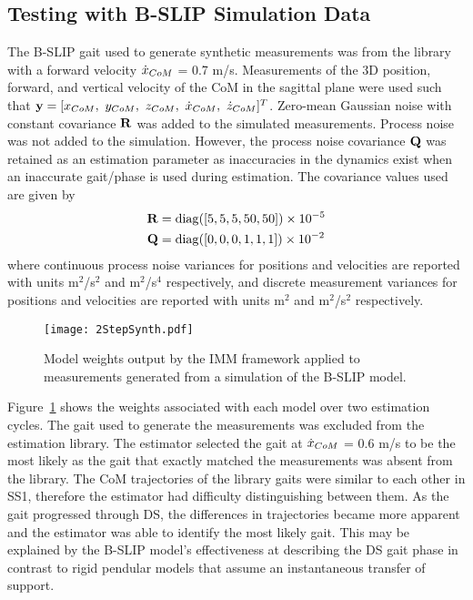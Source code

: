 \subsection{Testing with B-SLIP Simulation Data}

The B-SLIP gait used to generate synthetic measurements was from the library with a forward velocity $ \dot{x}_{CoM} $ = 0.7 m/s. Measurements of the 3D position, forward, and vertical velocity of the CoM in the sagittal plane were used such that $ \y = [x_{\com},\ y_{\com},\ z_{\com},\ \dot{x}_{\com},\ \dot{z}_{\com}]^T $. Zero-mean Gaussian noise with constant covariance $ \mathbf{R} $ was added to the simulated measurements. Process noise was not added to the simulation. However, the process noise covariance $ \mathbf{Q} $ was retained as an estimation parameter as inaccuracies in the dynamics exist when an inaccurate gait/phase is used during estimation. The covariance values used are given by
\begin{align}
	\mathbf{R} &= {\rm diag}([5 ,5 ,5  ,50 ,50]) 
\times 10^{-5} \\
\mathbf{Q} &={\rm diag}([0,0,0,1,1,1])
\times 10^{-2}
\end{align}
where continuous process noise variances for positions and velocities are reported with units m${}^2$/s${}^2$ and m${}^2$/s${}^4$ respectively, and discrete measurement variances for positions and velocities are reported with units m${}^2 $ and m${}^2$/s${}^2$ respectively. 

\begin{figure}
	\centering
	\texttt{[image: 2StepSynth.pdf]}
	\caption{Model weights output by the IMM framework applied to measurements generated from a simulation of the B-SLIP model.}\label{fig:weightSyn}
\end{figure}

Figure~\ref{fig:weightSyn} shows the weights associated with each model over two estimation cycles. The gait used to generate the measurements was excluded from the estimation library. The estimator selected the gait at $ \dot{x}_{CoM} $ = 0.6 m/s to be the most likely as the gait that exactly matched the measurements was absent from the library. The CoM trajectories of the library gaits were similar to each other in SS1, therefore the estimator had difficulty distinguishing between them. As the gait progressed through DS, the differences in trajectories became more apparent and the estimator was able to identify the most likely gait. This may be explained by the B-SLIP model's effectiveness at describing the DS gait phase in contrast to rigid pendular models that assume an instantaneous transfer of support.


